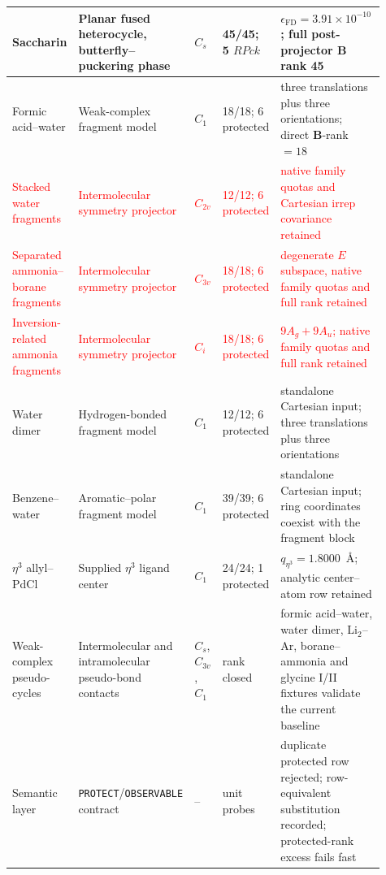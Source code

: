 \documentclass[10pt]{article}
\newcommand{\Bmat}{\mathbf{B}}
\begin{document}
\begin{longtable}{@{}p{0.14\linewidth}p{0.24\linewidth}p{0.07\linewidth}p{0.15\linewidth}p{0.31\linewidth}@{}}
\midrule
Saccharin & Planar fused heterocycle, butterfly--puckering phase & \(C_s\) & 45/45; 5 \(RPck\) & \(\epsilon_\mathrm{FD}=3.91\times10^{-10}\); full post-projector \(\Bmat\) rank 45 \\
\midrule
Formic acid--water & Weak-complex fragment model & \(C_1\) & 18/18; 6 protected & three translations plus three orientations; direct \(\Bmat\)-rank \(=18\) \\
\midrule
\textcolor{red}{Stacked water fragments} &
\textcolor{red}{Intermolecular symmetry projector} &
\textcolor{red}{\(C_{2v}\)} &
\textcolor{red}{12/12; 6 protected} &
\textcolor{red}{native family quotas and Cartesian irrep covariance retained} \\
\midrule
\textcolor{red}{Separated ammonia--borane fragments} &
\textcolor{red}{Intermolecular symmetry projector} &
\textcolor{red}{\(C_{3v}\)} &
\textcolor{red}{18/18; 6 protected} &
\textcolor{red}{degenerate \(E\) subspace, native family quotas and full rank retained} \\
\midrule
\textcolor{red}{Inversion-related ammonia fragments} &
\textcolor{red}{Intermolecular symmetry projector} &
\textcolor{red}{\(C_i\)} &
\textcolor{red}{18/18; 6 protected} &
\textcolor{red}{\(9A_g+9A_u\); native family quotas and full rank retained} \\
\midrule
Water dimer & Hydrogen-bonded fragment model & \(C_1\) & 12/12; 6 protected & standalone Cartesian input; three translations plus three orientations \\
\midrule
Benzene--water & Aromatic--polar fragment model & \(C_1\) & 39/39; 6 protected & standalone Cartesian input; ring coordinates coexist with the fragment block \\
\midrule
\(\eta^3\) allyl--PdCl & Supplied \(\eta^3\) ligand center & \(C_1\) & 24/24; 1 protected & \(q_{\eta^3}=1.8000\)~\AA; analytic center--atom row retained \\
\midrule
Weak-complex pseudo-cycles & Intermolecular and intramolecular pseudo-bond contacts & \(C_s\), \(C_{3v}\), \(C_1\) & rank closed & formic acid--water, water dimer, Li\(_2\)--Ar, borane--ammonia and glycine I/II fixtures validate the current baseline \\
\midrule
Semantic layer & \texttt{PROTECT}/\texttt{OBSERVABLE} contract & -- & unit probes & duplicate protected row rejected; row-equivalent substitution recorded; protected-rank excess fails fast \\
\bottomrule
\end{longtable}
\end{document}
